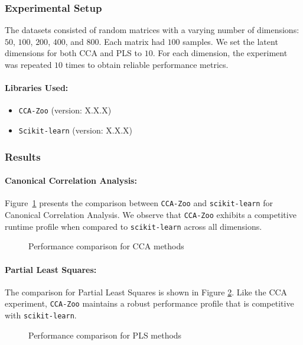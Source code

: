 \subsubsection{Experimental Setup}
The datasets consisted of random matrices with a varying number of dimensions: \(50\), \(100\), \(200\), \(400\), and \(800\). Each matrix had \(100\) samples. We set the latent dimensions for both CCA and PLS to \(10\). For each dimension, the experiment was repeated \(10\) times to obtain reliable performance metrics.

\paragraph{Libraries Used:}
\begin{itemize}
    \item \texttt{CCA-Zoo} (version: X.X.X)
    \item \texttt{Scikit-learn} (version: X.X.X)
\end{itemize}

\subsubsection{Results}

\paragraph{Canonical Correlation Analysis:}
Figure~\ref{fig:cca_benchmark} presents the comparison between \texttt{CCA-Zoo} and \texttt{scikit-learn} for Canonical Correlation Analysis. We observe that \texttt{CCA-Zoo} exhibits a competitive runtime profile when compared to \texttt{scikit-learn} across all dimensions.

\begin{figure}[h]
\centering

\caption{Performance comparison for CCA methods}
\label{fig:cca_benchmark}
\end{figure}

\paragraph{Partial Least Squares:}
The comparison for Partial Least Squares is shown in Figure \ref{fig:pls_benchmark}.
Like the CCA experiment, \texttt{CCA-Zoo} maintains a robust performance profile that is competitive with \texttt{scikit-learn}.

\begin{figure}[h]
\centering

\caption{Performance comparison for PLS methods}
\label{fig:pls_benchmark}
\end{figure}

